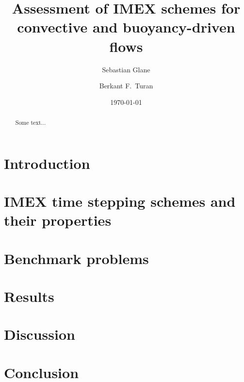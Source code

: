 \documentclass[aps,preprint]{revtex4-1}
\begin{document}

\title{Assessment of IMEX schemes for convective and buoyancy-driven flows}

\author{Sebastian Glane}
\author{Berkant F.\ Turan}


\date{\today}

\begin{abstract}
Some text...
\end{abstract}

\maketitle %

\section{Introduction\label{sec:Introduction}}
\section{IMEX time stepping schemes and their properties\label{sec:IMEXSchemes}}
\section{Benchmark problems\label{sec:BenchmarkProblems}}
\section{Results\label{sec:Results}}
\section{Discussion\label{sec:Discussion}}
\section{Conclusion\label{sec:Conclusion}}

\appendix*   %


\end{document}
